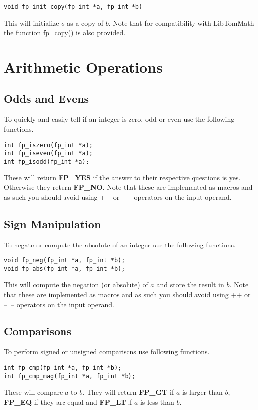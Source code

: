 \documentclass[b5paper]{book}
\begin{document}
\begin{verbatim}
void fp_init_copy(fp_int *a, fp_int *b)
\end{verbatim}

This will initialize $a$ as a copy of $b$.  Note that for compatibility with LibTomMath the function
fp\_copy() is also provided.

\chapter{Arithmetic Operations}
\section{Odds and Evens}
To quickly and easily tell if an integer is zero, odd or even use the following functions.

  
\begin{verbatim}
int fp_iszero(fp_int *a);
int fp_iseven(fp_int *a);
int fp_isodd(fp_int *a);
\end{verbatim}

These will return \textbf{FP\_YES} if the answer to their respective questions is yes.  Otherwise they
return \textbf{FP\_NO}.  Note that these are implemented as macros and as such you should avoid using 
++ or --~-- operators on the input operand.

\section{Sign Manipulation}
To negate or compute the absolute of an integer use the following functions.

 
\begin{verbatim}
void fp_neg(fp_int *a, fp_int *b);
void fp_abs(fp_int *a, fp_int *b);
\end{verbatim}
This will compute the negation (or absolute) of $a$ and store the result in $b$.  Note that these 
are implemented as macros and as such you should avoid using ++ or --~-- operators on the input 
operand.

\section{Comparisons}
To perform signed or unsigned comparisons use following functions.

 
\begin{verbatim}
int fp_cmp(fp_int *a, fp_int *b);
int fp_cmp_mag(fp_int *a, fp_int *b);
\end{verbatim}
These will compare $a$ to $b$.  They will return \textbf{FP\_GT} if $a$ is larger than $b$, 
\textbf{FP\_EQ} if they are equal and \textbf{FP\_LT} if $a$ is less than $b$.
\end{document}
